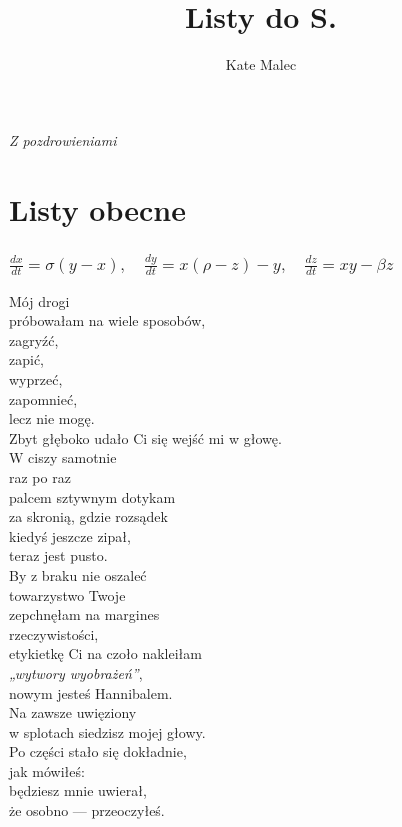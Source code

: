 \documentclass[12pt, a4paper]{memoir}
\title{Listy do S.}
\author{Kate Malec}
\date{\the\year}
\renewenvironment{verse}{%
  \par\vspace{\baselineskip}\raggedright
}{
  \par\vspace{\baselineskip}
}
\begin{document}
\maketitle
\thispagestyle{empty}
\newpage

\thispagestyle{empty}
\vspace*{\fill}
\begin{flushright}
    \itshape
    Z pozdrowieniami
\end{flushright}

\newpage
\tableofcontents*
\newpage


\part{Listy obecne}

\section[Układ Lorenza]{%
$ \frac{dx}{dt} = \sigma(y - x), \quad \frac{dy}{dt} = x(\rho - z) - y, \quad \frac{dz}{dt} = xy - \beta z $%
}
\begin{verse}
Mój drogi\\
próbowałam na wiele sposobów,\\
zagryźć,\\
zapić,\\
wyprzeć,\\
zapomnieć,\\
lecz nie mogę.\\
Zbyt głęboko udało Ci się wejść mi w głowę.\\[\baselineskip]

W ciszy samotnie\\
raz po raz\\
palcem sztywnym dotykam\\
za skronią, gdzie rozsądek\\
kiedyś jeszcze zipał,\\
teraz jest pusto.\\[\baselineskip]

By z braku nie oszaleć\\
towarzystwo Twoje\\
zepchnęłam na margines\\
rzeczywistości,\\
etykietkę Ci na czoło nakleiłam\\
\textit{„wytwory wyobrażeń”},\\
nowym jesteś Hannibalem.\\
Na zawsze uwięziony\\
w splotach siedzisz mojej głowy.\\[\baselineskip]

Po części stało się dokładnie,\\
jak mówiłeś:\\
będziesz mnie uwierał,\\
że osobno --- przeoczyłeś.
\end{verse}
\end{document}

